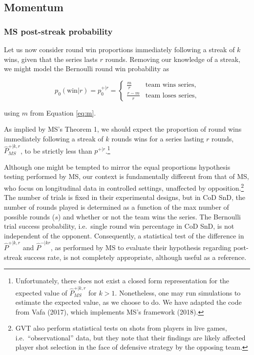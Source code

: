 \documentclass{article}
\begin{document}
\hypertarget{momentum}{%
\subsection{Momentum}\label{momentum}}

\hypertarget{ms-post-streak-probability}{%
\subsubsection{MS post-streak
probability}\label{ms-post-streak-probability}}

Let us now consider round win proportions immediately following a streak
of \(k\) wins, given that the series lasts \(r\) rounds. Removing our
knowledge of a streak, we might model the Bernoulli round win
probability as

\begin{equation}\label{eq:pwr}
p_0(\text{win} | r) = p^{+|r}_0 = \begin{cases} 
  \frac{m}{r} & \text{team wins series}, \\ 
  \frac{r - m}{r} & \text{team loses series},
\end{cases}
\end{equation}

using \(m\) from Equation \ref{eq:m}.

As implied by MS's Theorem 1, we should expect the proportion of round
wins immediately following a streak of \(k\) rounds wins for a series
lasting \(r\) rounds, \(\hat{P}^{+|k,r}_{MS}\), to be strictly less than
\(p^{+|r}\).\footnote{Unfortunately, there does not exist a closed form
  representation for the expected value of \(\hat{P}^{+|k,r}_{MS}\) for
  \(k > 1\). Nonetheless, one may run simulations to estimate the
  expected value, as we choose to do. We have adapted the code from Vafa
  (2017), which implements MS's framework (2018).}

Although one might be tempted to mirror the equal proportions hypothesis
testing performed by MS, our context is fundamentally different from
that of MS, who focus on longitudinal data in controlled settings,
unaffected by opposition.\footnote{GVT also perform statistical tests on
  shots from players in live games, i.e.~``observational'' data, but
  they note that their findings are likely affected player shot
  selection in the face of defensive strategy by the opposing team.} The
number of trials is fixed in their experimental designs, but in CoD SnD,
the number of rounds played is determined as a function of the max
number of possible rounds (\(s\)) and whether or not the team wins the
series. The Bernoulli trial success probability, i.e.~single round win
percentage in CoD SnD, is not independent of the opponent. Consequently,
a statistical test of the difference in \(\hat{P}^{+|k,r}\) and
\(\hat{P}^{-|kr}\), as performed by MS to evaluate their hypothesis
regarding post-streak success rate, is not completely appropriate,
although useful as a reference.
\end{document}

